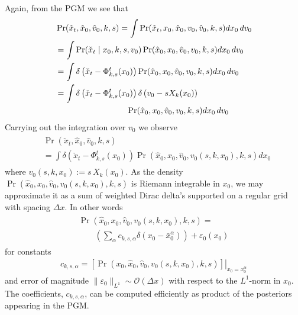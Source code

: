 \documentclass[conference]{IEEEtran}
\begin{document}
Again, from the PGM we see that
\begin{align*}
	&\Pr( \check{x}_t , \hat{x}_0, \hat{v}_0, k,s) = \int \Pr( \check{x}_t , x_0, \hat{x}_0, v_0, \hat{v}_0, k,s) dx_0 \, dv_0 \\
		&=  \int \Pr( \check{x}_t \mid  x_0, k,s, v_0) \Pr(\hat{x}_0, x_0, \hat{v}_0, v_0, k, s) dx_0 \, dv_0 \\
		&= \int \delta\left( \check{x}_t - \Phi_{k,s}^{t}( x_0) \right) \Pr(\hat{x}_0, x_0, \hat{v}_0, v_0, k, s) dx_0 \, dv_0 \\
		&= \int \delta\left( \check{x}_t - \Phi_{k,s}^{t}( x_0) \right) \delta\left( v_0 - s X_k (x_0) \right) \\
		&\hspace{20ex} \Pr(\hat{x}_0, x_0, \hat{v}_0, v_0, k, s) dx_0\, dv_0
\end{align*}
Carrying out the integration over $v_0$ we observe
\begin{align}
\begin{split}
	&\Pr( \check{x}_t , \hat{x}_0, \hat{v}_0, k,s) \\
	&= \int \delta\left( \check{x}_t - \Phi_{k,s}^{t}( x_0) \right) \Pr(\hat{x}_0, x_0, \hat{v}_0, v_0(s,k,x_0), k, s) dx_0
\end{split}
\label{eq:push forward}
\end{align}
where $v_0(s,k,x_0) := s\, X_k(x_0)$. As the density $\Pr(\hat{x}_0, x_0, \hat{v}_0, v_0(s,k,x_0), k, s) $ is Riemann integrable in $x_0$,
 we may approximate it as a sum of weighted Dirac delta's supported on a regular grid with spacing $\Delta x$.
In other words
\begin{align}
	\begin{split}
		\Pr(\hat{x}_0, x_0, \hat{v}_0, v_0(s,k,x_0), k, s) = \\
		\qquad \left( \sum_{\alpha} c_{k,s,\alpha} \delta( x_0 - \bar{x}_0^\alpha ) \right) + \varepsilon_0(x_0)
	\end{split}
	\label{eq:approximation 1}
\end{align}
for constants
\begin{align}
	c_{k,s,\alpha} =  \left. \left[ \Pr( x_0, \hat{x}_0 , \hat{v}_0, v_0(s,k,x_0), k,s) \right] \right|_{x_0 = x_0^\alpha} \label{eq:constants}
\end{align}
and error of magnitude $\| \varepsilon_0 \|_{L^1} \sim \mathcal{O}( \Delta x)$ with respect to the $L^1$-norm in $x_0$.
The coefficients, $c_{k,s,\alpha}$, can be computed efficiently as product of the posteriors appearing in the PGM.
\end{document}
